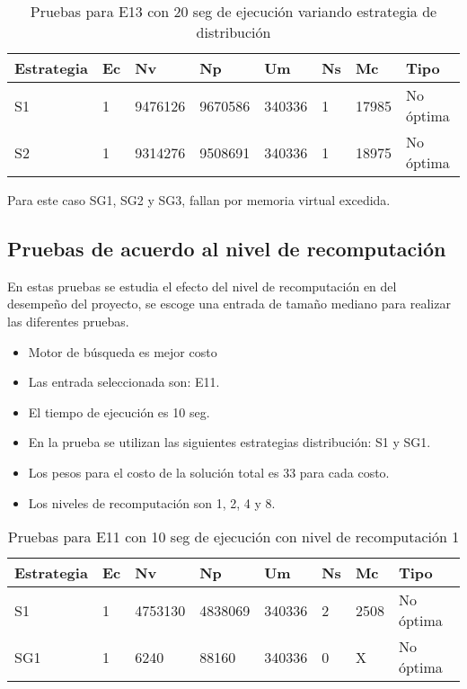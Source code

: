 \begin{center}
\begin{longtable}{|p{3cm}|p{1.0cm}|p{1.6cm}|p{1.6cm}|p{1.1cm}|p{1.1cm}|p{1.1cm}|p{2.7cm}|}
	\caption{Pruebas para E13 con 20 seg de ejecución variando estrategia de distribución}\\
	\hline
	\cellcolor[gray]{0.9} \textbf{Estrategia} & \cellcolor[gray]{0.9}\textbf{Ec} & \cellcolor[gray]{0.9}\textbf{Nv} & \cellcolor[gray]{0.9}\textbf{Np} & \cellcolor[gray]{0.9}\textbf{Um} & \cellcolor[gray]{0.9}\textbf{Ns} &  \cellcolor[gray]{0.9}\textbf{Mc} & \cellcolor[gray]{0.9}\textbf{Tipo}\\	\hline
	S1& 1 &9476126  &9670586 &340336  &1 &17985&No óptima \\
	\hline
	S2& 1 &9314276  &9508691 &340336  &1 &18975&No óptima \\
	\hline
\end{longtable}	
\end{center}

Para este caso SG1, SG2 y SG3, fallan por memoria virtual excedida.

\subsection{Pruebas de acuerdo al nivel de recomputación}

En estas pruebas se estudia el efecto del nivel de recomputación en del desempeño del proyecto, se escoge una entrada de tamaño mediano para realizar las diferentes pruebas. 

\begin{itemize}
	\item Motor de búsqueda es mejor costo
	\item Las entrada seleccionada son: E11.	
	\item El tiempo de ejecución es 10 seg.
	\item En la prueba se utilizan las siguientes estrategias distribución: S1 y SG1.
	\item Los pesos para el costo de la solución total es 33 para cada costo.
	\item Los niveles de recomputación son 1, 2, 4 y 8.
\end{itemize}


\begin{center}
\begin{longtable}{|p{3cm}|p{1.0cm}|p{1.6cm}|p{1.6cm}|p{1.1cm}|p{1.1cm}|p{1.1cm}|p{2.7cm}|}
	\caption{Pruebas para E11 con 10 seg de ejecución con nivel de recomputación 1} \\
	\hline
	\cellcolor[gray]{0.9} \textbf{Estrategia} & \cellcolor[gray]{0.9}\textbf{Ec} & \cellcolor[gray]{0.9}\textbf{Nv} & \cellcolor[gray]{0.9}\textbf{Np} & \cellcolor[gray]{0.9}\textbf{Um} & \cellcolor[gray]{0.9}\textbf{Ns} &  \cellcolor[gray]{0.9}\textbf{Mc} & \cellcolor[gray]{0.9}\textbf{Tipo}\\	\hline
	S1& 1 &4753130  &4838069 &340336 &2 &2508&No óptima \\
	\hline
	SG1& 1 &6240  &88160 &340336  &0 &X&No óptima \\
	\hline
\end{longtable}	
\end{center}

